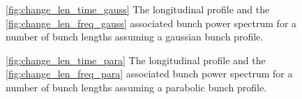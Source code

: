 \begin{figure}
\caption{\ref{fig:change_len_time_gauss} The longitudinal profile and the \ref{fig:change_len_freq_gauss} associated bunch power spectrum for a number of bunch lengths assuming a gaussian bunch profile.}
\label{fig:diff_bunch_len_gauss}
\end{figure}

\begin{figure}
\caption{\ref{fig:change_len_time_para} The longitudinal profile and the \ref{fig:change_len_freq_para} associated bunch power spectrum for a number of bunch lengths assuming a parabolic bunch profile.}
\label{fig:diff_bunch_len_para}
\end{figure}

